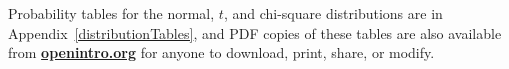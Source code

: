 Probability tables for the normal, $t$, and chi-square distributions are in Appendix~\ref{distributionTables}, and PDF copies of these tables are also available from \href{http://www.openintro.org}{\color{black}\textbf{openintro.org}} for anyone to download, print, share, or modify.





